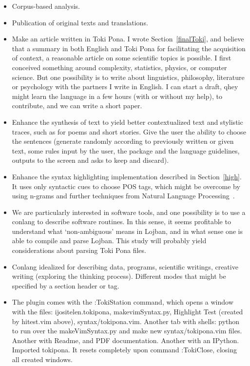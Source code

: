 \documentclass{article}
\begin{document}
\begin{itemize}
  \item Corpus-based analysis.
  \item Publication of original texts and translations.
  \item Make an article written in Toki Pona.
    I wrote Section~\ref{finalToki}, and believe that
    a summary in both English and Toki Pona for
    facilitating the acquisition of context,
    a reasonable article on some scientific topics is
    possible.
    I first conceived something around complexity, statistics, physics, or computer science.
    But one possibility is to write about linguistics, philosophy, literature
    or psychology with the partners I write in English.
    I can start a draft,
    qhey might learn the language in a few hours (with or without my help),
    to contribute, and we can write a short paper.
  \item Enhance the synthesis of text to yield better contextualized text
    and stylistic traces, such as for poems and short stories.
    Give the user the ability to choose the sentences (generate randomly according to
    previously written or given text,
    some rules input by the user, the package and the language guidelines,
    outputs to the screen and asks to keep and discard).
  \item Enhance the syntax highlighting implementation described in Section~\ref{high}.
    It uses only syntactic cues to choose POS tags,
    which might be overcome by using n-grams and
    further techniques from Natural Language Processing~\cite{POS}.
  \item We are particularly interested in software tools,
    and one possibility is to use a conlang to describe software
    routines.
    In this sense, it seems profitable
    to understand what `non-ambiguous' means in Lojban,
    and in what sense one is able to compile and parse Lojban.
    This study will probably yield considerations about
    parsing Toki Pona files.
  \item Conlang idealized for describing data, programs,
    scientific writings, creative writing
    (exploring the thinking process).
    Different modes that might be specified by a section header or tag.
  \item The plugin comes with the :TokiStation command, which opens a window with the files: ijositelen.tokipona, makevimSyntax.py, Highlight Test (created by hitest.vim above), syntax/tokipona.vim.  Another tab with shells: python to run over the makeVimSyntax.py and make new syntax/tokipona.vim files. Another with Readme, and PDF documentation. Another with an IPython. Imported tokipona. It resets completely upon command :TokiClose, closing all created windows.
\end{itemize}
\end{document}
